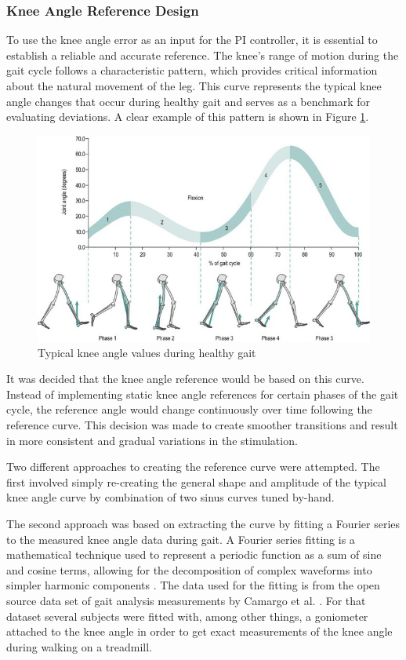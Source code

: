 \subsubsection{Knee Angle Reference Design}
To use the knee angle error as an input for the PI controller, it is essential to establish a reliable and accurate reference. The knee’s range of motion during the gait cycle follows a characteristic pattern, which provides critical information about the natural movement of the leg. This curve represents the typical knee angle changes that occur during healthy gait and serves as a benchmark for evaluating deviations. A clear example of this pattern is shown in Figure \ref{fig:kneecurvetypical}.

\begin{figure} [h]
    \centering
    \includegraphics[width=0.99\linewidth]{images/B9780702043444000158_f015-005-9780702043444.jpg}
    \caption{Typical knee angle values during healthy gait \cite{themes_biomechanics_2017}}
    \label{fig:kneecurvetypical}
\end{figure}
It was decided that the knee angle reference would be based on this curve. Instead of implementing static knee angle references for certain phases of the gait cycle, the reference angle would change continuously over time following the reference curve. This decision was made to create smoother transitions and result in more consistent and gradual variations in the stimulation.

Two different approaches to creating the reference curve were attempted. The first involved simply re-creating the general shape and amplitude of the typical knee angle curve by combination of two sinus curves tuned by-hand. 

The second approach was based on extracting the curve by fitting a Fourier series to the measured knee angle data during gait. A Fourier series fitting is a mathematical technique used to represent a periodic function as a sum of sine and cosine terms, allowing for the decomposition of complex waveforms into simpler harmonic components \cite{blackledget_chapter_2006}. The data used for the fitting is from the open source data set of gait analysis measurements by Camargo et al. \cite{camargo_comprehensive_2021}. For that dataset several subjects were fitted with, among other things, a goniometer attached to the knee angle in order to get exact measurements of the knee angle during walking on a treadmill. 

